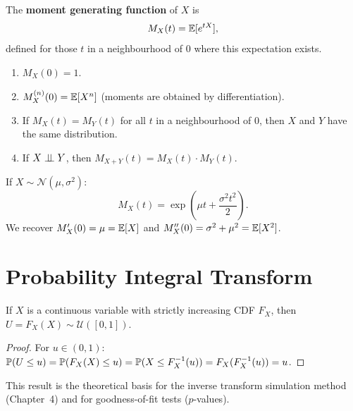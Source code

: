 \begin{definition}
The \textbf{moment generating function} of $X$ is
\[
    M_X(t) = \mathbb{E}[e^{tX}],
\]
defined for those $t$ in a neighbourhood of $0$ where this expectation exists.
\end{definition}

\begin{proposition}
\begin{enumerate}[label=(\roman*)]
    \item $M_X(0) = 1$.
    \item $M_X^{(n)}(0) = \mathbb{E}[X^n]$ (moments are obtained by differentiation).
    \item If $M_X(t) = M_Y(t)$ for all $t$ in a neighbourhood of $0$, then $X$
          and $Y$ have the same distribution.
    \item If $X \perp\!\!\!\perp Y$, then $M_{X+Y}(t) = M_X(t)\cdot M_Y(t)$.
\end{enumerate}
\end{proposition}

\begin{example}
If $X \sim \mathcal{N}(\mu, \sigma^2)$:
\[
    M_X(t) = \exp\!\left(\mu t + \frac{\sigma^2 t^2}{2}\right).
\]
We recover $M_X'(0) = \mu = \mathbb{E}[X]$ and $M_X''(0) = \sigma^2 + \mu^2 = \mathbb{E}[X^2]$.
\end{example}

\section{Probability Integral Transform}

\begin{theorem}
If $X$ is a continuous variable with strictly increasing CDF $F_X$, then
$U = F_X(X) \sim \mathcal{U}([0,1])$.
\end{theorem}

\begin{proof}
For $u \in (0,1)$:
$\mathbb{P}(U \leq u) = \mathbb{P}(F_X(X) \leq u) = \mathbb{P}(X \leq F_X^{-1}(u))
= F_X(F_X^{-1}(u)) = u$.
\end{proof}

\begin{remark}
This result is the theoretical basis for the inverse transform simulation method
(Chapter~4) and for goodness-of-fit tests ($p$-values).
\end{remark}

